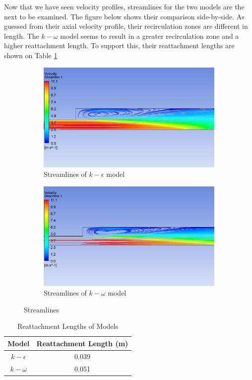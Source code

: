 \noindent Now that we have seen velocity profiles, streamlines for the two models are the next to be examined. The figure below shows their comparison side-by-side. As guessed from their axial velocity profile, their recirculation zones are different in length. The $k-\omega$ model seems to result in a greater recirculation zone and a higher reattachment length. To support this, their reattachment lengths are shown on Table \ref{tab:task2}


\begin{figure}[H]
    \centering
    \begin{subfigure}{.8\textwidth}
    \centering
    \includegraphics[width=.8\linewidth]{images/task2/task2-1/2-1streamline.png}
    \caption{Streamlines of $k-\epsilon$ model}
    \end{subfigure}
    
\begin{subfigure}{.8\textwidth}
    \centering
    \includegraphics[width=.8\linewidth]{images/task2/task2-2/2-2streamline.png}
    \caption{Streamlines of $k-\omega$ model}
\end{subfigure}
    \caption{Streamlines}
    \label{fig:stream_task2}
\end{figure}


\begin{table}[H]
\centering
\caption{Reattachment Lengths of Models}
\begin{tabular}{c|c}
Model & Reattachment Length (m) \\ \hline
$k-\epsilon$  & 0.039                   \\
$k-\omega$   & 0.051                  
\end{tabular}

\label{tab:task2}
\end{table}

